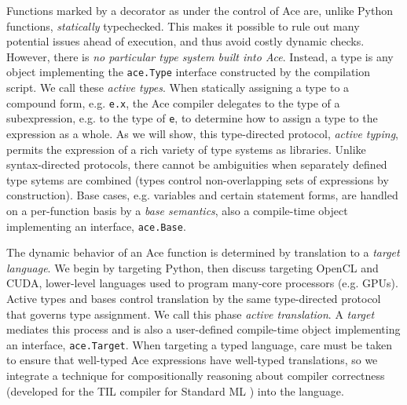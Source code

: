 \documentclass[10pt,preprint]{sigplanconf}
\begin{document}
Functions marked by a decorator as under the control of Ace are, unlike Python functions, \emph{statically} typechecked. This makes it possible to rule out many potential issues ahead of execution, and thus  avoid  costly dynamic checks. %
However, there is \emph{no particular type system built into Ace}. Instead, a type is any  object implementing the \verb|ace.Type| interface constructed by the compilation script. We call these \emph{active types}. When statically assigning a type to a compound form, e.g. \verb|e.x|, the Ace {compiler} delegates to the type of a subexpression, e.g. to the type of \verb|e|, to determine how to assign a type to the expression as a whole. As we will show, this {type-directed protocol}, \emph{active typing}, permits the expression of a rich variety of type systems as libraries. Unlike syntax-directed protocols, there cannot be ambiguities when separately defined type sytems are combined (types control non-overlapping sets of expressions by construction). Base cases, e.g.  variables and certain statement forms, are handled on a {per-function basis} by a \emph{base semantics}, also a compile-time object implementing an interface, \verb|ace.Base|.


The dynamic behavior of an Ace function is determined by translation to a \emph{target language}. We begin by  targeting Python, then discuss targeting OpenCL and CUDA, lower-level languages used to program many-core processors (e.g. GPUs). Active types and bases control translation by the same type-directed protocol that governs type assignment. We call this phase \emph{active translation}. A \emph{target} mediates this process and is also a user-defined compile-time object implementing an interface, \verb|ace.Target|. 
When targeting a typed language, care must be taken to ensure that well-typed Ace expressions have well-typed translations, so we integrate a technique for compositionally reasoning about compiler correctness (developed for the TIL compiler for Standard ML \cite{tarditi+:til-OLD}) into the language.
\end{document}
